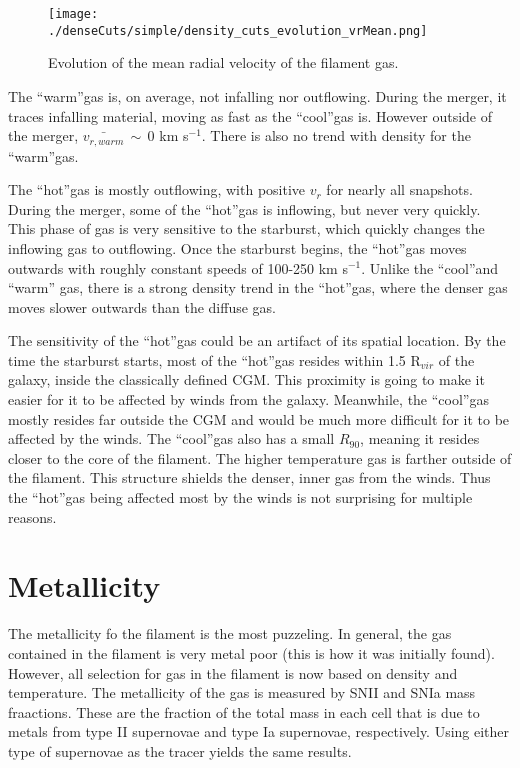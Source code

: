 \documentclass{article}
\newcommand{\rvir}{R$_{vir}$}
\newcommand{\cool}{``cool''}
\newcommand{\warm}{``warm''}
\newcommand{\hot}{``hot''}
\newcommand{\kms}{km s$^{-1}$}
\begin{document}
\begin{figure}[h!]
\centering
\texttt{[image: ./denseCuts/simple/density\_cuts\_evolution\_vrMean.png]}
\caption{Evolution of the mean radial velocity of the filament gas.}
\label{vrmean}
\end{figure}

The \warm gas is, on average, not infalling nor outflowing. During the merger, it
traces infalling material, moving as fast as the \cool gas is. However outside of
the merger, $\bar{v_{r,warm}}\,\sim\,0$ \kms. There is also no trend with density
for the \warm gas. 

The \hot gas is mostly outflowing, with positive $v_r$ for nearly all snapshots.
During the merger, some of the \hot gas is inflowing, but never very quickly.
This phase of gas is very sensitive to the starburst, which quickly changes the
inflowing gas to outflowing. Once the starburst begins, the \hot gas moves
outwards with roughly constant speeds of 100-250 \kms. Unlike the \cool and \warm
gas, there is a strong density trend in the \hot gas, where the denser gas moves
slower outwards than the diffuse gas. 

The sensitivity of the \hot gas could be an artifact of its spatial location.
By the time the starburst starts, most of the \hot gas resides within 1.5 \rvir
of the galaxy, inside the classically defined CGM. This proximity is going to
make it easier for it to be affected by winds from the galaxy. Meanwhile, the
\cool gas mostly resides far outside the CGM and would be much more difficult for
it to be affected by the winds. The \cool gas also has a small $R_{90}$, meaning
it resides closer to the core of the filament. The higher temperature gas is
farther outside of the filament. This structure shields the denser, inner gas
from the winds. Thus the \hot gas being affected most by the winds is not
surprising for multiple reasons. 




\section{Metallicity}
The metallicity fo the filament is the most puzzeling. In general, the gas
contained in the filament is very metal poor (this is how it was initially
found). However, all selection for gas in the filament is now based on density
and temperature. The metallicity of the gas is measured by SNII and SNIa mass
fraactions. These are the fraction of the total mass in each cell that is due to
metals from type II supernovae and type Ia supernovae, respectively. Using either
type of supernovae as the tracer yields the same results. 
\end{document}
